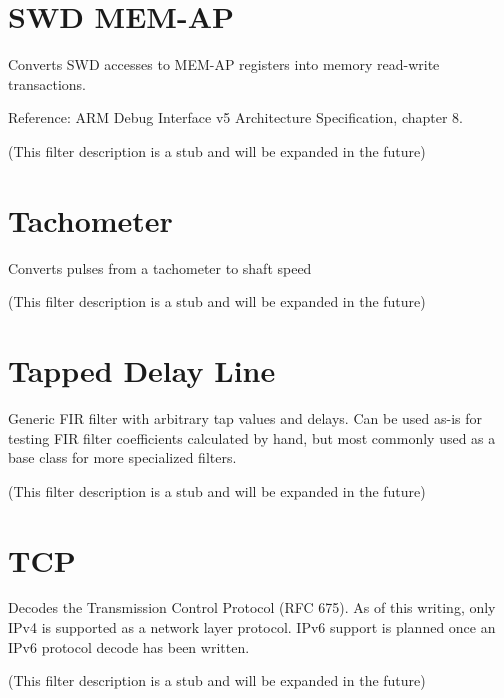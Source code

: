 \pagebreak
\section{SWD MEM-AP}

Converts SWD accesses to MEM-AP registers into memory read-write transactions.

Reference: ARM Debug Interface v5 Architecture Specification, chapter 8.

(This filter description is a stub and will be expanded in the future)

\pagebreak
\section{Tachometer}

Converts pulses from a tachometer to shaft speed

(This filter description is a stub and will be expanded in the future)

\pagebreak
\section{Tapped Delay Line}

Generic FIR filter with arbitrary tap values and delays. Can be used as-is for testing FIR filter coefficients
calculated by hand, but most commonly used as a base class for more specialized filters.

(This filter description is a stub and will be expanded in the future)

\pagebreak
\section{TCP}

Decodes the Transmission Control Protocol (RFC 675). As of this writing, only IPv4 is supported as a network layer
protocol. IPv6 support is planned once an IPv6 protocol decode has been written.

(This filter description is a stub and will be expanded in the future)

